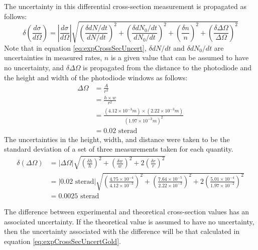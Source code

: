 \documentclass[a4paper]{article}
\begin{document}
The uncertainty in this differential cross-section measurement is propagated as follows:
\begin{equation} \label{eq:expCrossSecUncert}
 \delta \left( \frac{d \sigma}{d \Omega} \right) 
   = \left\lvert \frac{d \sigma}{d \Omega} \right\rvert
   \sqrt
   {
        \left( \frac{\delta dN/dt}{dN/dt} \right) ^2
        +
        \left( \frac{\delta dN_0/dt}{dN_0/dt} \right) ^2
        +
        \left( \frac{\delta n}{n} \right) ^2
        +
        \left( \frac{\delta \Delta \Omega}{\Delta \Omega} \right) ^2
   }
\end{equation}
Note that in equation \ref{eq:expCrossSecUncert}, $\delta dN/dt$ and $\delta dN_0/dt$ are uncertainties in measured rates, $n$ is a given value that can be assumed to have no uncertainty, and $\delta \Delta \Omega$ is propagated from the distance to the photodiode and the height and width of the photodiode windows as follows:
\begin{align*}
\Delta \Omega &= \frac{A}{r^2} \\
              &= \frac{h \times w}{r^2} \\
              &= \frac{(4.12 \times 10^{-3}m) \times (2.22 \times 10^{-3}m)}{(1.97 \times 10^{-2} m)^2} \\
              &= 0.02 \text{ sterad}
\end{align*}
The uncertainties in the height, width, and distance were taken to be the standard deviation of a set of three measurements taken for each quantity.
\begin{align*}
 \delta \left( \Delta \Omega  \right) 
   &= | \Delta \Omega |
   \sqrt{ 
        \left( \frac{\delta h}{h} \right) ^2
        +
         \left( \frac{\delta w}{w} \right) ^2  
        + 2 \left( \frac{\delta r}{r} \right) ^2  
   } \\
   &= | 0.02 \text{ sterad} |
   \sqrt{ 
        \left( \frac{4.75 \times 10^{-4}}{4.12 \times 10^{-3}} \right) ^2
        +
         \left( \frac{7.64 \times 10^{-5}}{2.22 \times 10^{-3}} \right) ^2  
        + 2 \left( \frac{5.01 \times 10^{-4}}{1.97 \times 10^{-2}} \right) ^2  
   } \\
   &= 0.0025 \text{ sterad}
\end{align*}

The difference between experimental and theoretical cross-section values has an associated uncertainty. If the theoretical value is assumed to have no uncertainty, then the uncertainty associated with the difference will be that calculated in equation \ref{eq:expCrossSecUncertGold}.
\end{document}
